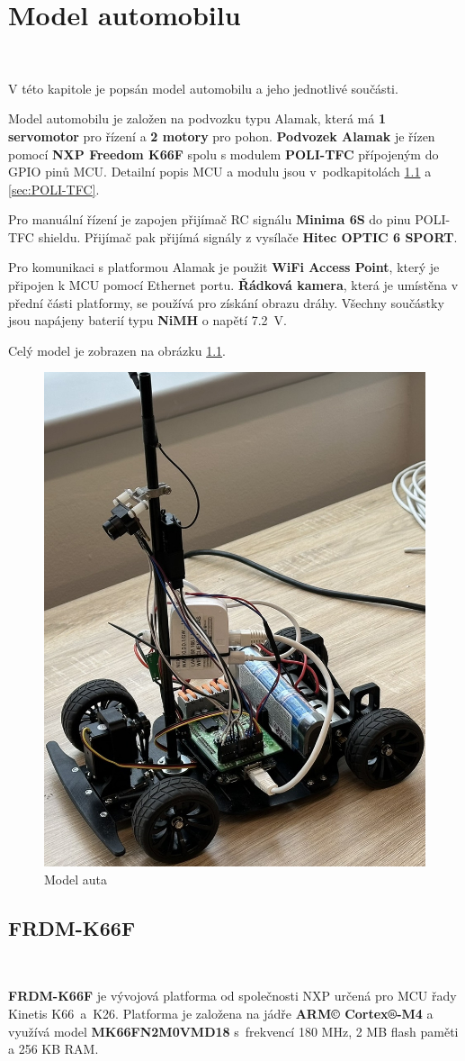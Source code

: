 \chapter{Model automobilu}
\label{sec:CarModel}
\

V této kapitole je popsán model automobilu a jeho jednotlivé součásti.

Model automobilu je založen na podvozku typu Alamak, která má \textbf{1 servomotor}
pro řízení a \textbf{2 motory} pro pohon.
\textbf{Podvozek Alamak} je řízen pomocí \textbf{NXP Freedom K66F} \cite{frdmk66UserGuide} spolu s modulem \textbf{POLI-TFC} přípojeným do GPIO pinů
MCU. Detailní popis MCU a modulu jsou v~podkapitolách \ref{sec:FRDM-K66F}
a \ref{sec:POLI-TFC}.

Pro manuální řízení je zapojen přijímač RC signálu \textbf{Minima 6S} do pinu
POLI-TFC shieldu. Přijímač pak přijímá signály z vysílače \textbf{Hitec OPTIC 6 SPORT}.

Pro komunikaci s platformou Alamak je použit \textbf{WiFi Access Point}, který je
připojen k MCU pomocí Ethernet portu. \textbf{Řádková kamera}, která je umístěna
v přední části platformy, se používá pro získání obrazu dráhy. Všechny součástky
jsou napájeny baterií typu \textbf{NiMH} o napětí 7.2~V.

Celý model je zobrazen na obrázku \ref{fig:car}.
\begin{figure}[!h]
    \centering
    \includegraphics[width = .4\linewidth]{Figures/Car.jpeg}
    \caption{Model auta}
    \label{fig:car}
\end{figure}

\section{FRDM-K66F}
\label{sec:FRDM-K66F}\

\textbf{FRDM-K66F} je vývojová platforma od společnosti NXP určená pro MCU řady Kinetis
K66~a~K26. Platforma je založena na jádře \textbf{ARM© Cortex®-M4} a využívá model
\textbf{MK66FN2M0VMD18} s~frekvencí 180 MHz, 2 MB flash paměti a 256 KB RAM.

